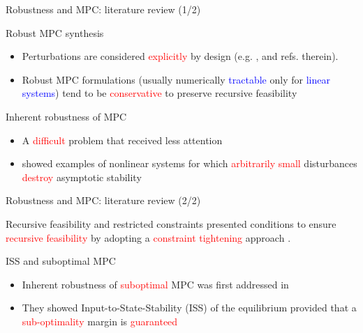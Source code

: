 \documentclass{beamer}
\newcommand{\red}[1]{\textcolor{red}{#1}}
\newcommand{\blue}[1]{\textcolor{blue}{#1}}
\begin{document}
\begin{frame}{Robustness and MPC: literature review (1/2)}

\begin{alertblock}{Robust MPC synthesis}
\begin{itemize}
\item Perturbations are considered \red{explicitly} by design (e.g.
\citep{bemporad:morari:1999}, \citep[Ch. 3]{rawlings:mayne:2009} and refs. therein).

\item Robust MPC formulations (usually numerically \blue{tractable} only for \blue{linear systems})
tend to be \red{conservative} to preserve recursive feasibility
\end{itemize}
\end{alertblock}

\begin{exampleblock}{Inherent robustness of MPC}
\begin{itemize}
\item A \red{difficult} problem that received less attention \citep{denicolao:magni:scattolini:1996b,scokaert:rawlings:meadows:1997,grimm:messina:tuna:teel:2004}

\item \cite{grimm:messina:tuna:teel:2004} showed examples of nonlinear systems for which \red{arbitrarily small} disturbances \red{destroy} asymptotic stability
\end{itemize}
\end{exampleblock}
\end{frame}

\begin{frame}{Robustness and MPC: literature review (2/2)}
\begin{alertblock}{Recursive feasibility and restricted constraints}
\cite{grimm:messina:tuna:teel:2007} presented conditions to ensure \red{recursive feasibility} by adopting a \red{constraint tightening} approach \citep{marruedo:alamo:camacho:2002a}.
\end{alertblock}

\begin{exampleblock}{ISS and suboptimal MPC}
\begin{itemize}
\item Inherent robustness of \red{suboptimal} MPC was first addressed in \citep{lazar:heemels:2009}
\item They showed Input-to-State-Stability (ISS) of the equilibrium provided that a \red{sub-optimality} margin is \red{guaranteed}
\end{itemize}
\end{exampleblock}
\end{frame}
\end{document}
